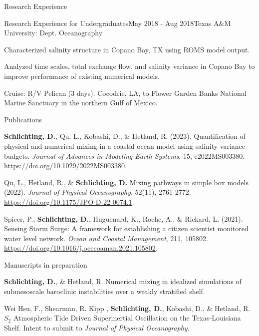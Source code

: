\documentclass{resume} %
\begin{document}
\begin{rSection}{Research Experience}
\begin{rSubsection}{Research Experience for Undergraduates}{May 2018 - Aug 2018}{Texas A$\&$M University: Dept. Oceanography}{} 
\item Characterized salinity structure in Copano Bay, TX using ROMS model output.
\item Analyzed time scales, total exchange flow, and salinity variance in Copano Bay to improve performance of existing numerical models.
\item Cruise: R/V Pelican (3 days). Cocodrie, LA, to Flower Garden Banks National Marine Sanctuary in the northern Gulf of Mexico.
\end{rSubsection} 
\end{rSection} 
\vspace{-3pt}

\begin{rSection}{Publications}
\vspace{-3pt}

\begin{etaremune}
\item \textbf{Schlichting, D.}, Qu, L., Kobashi, D., \& Hetland, R. (2023). Quantification of physical and numerical mixing in a coastal ocean model using salinity variance budgets. \textit{Journal of Advances in Modeling Earth Systems},
15, e2022MS003380. \url{https://doi.org/10.1029/2022MS003380}.
\item Qu, L., Hetland, R., \& \textbf{Schlichting, D.} Mixing pathways in simple box models (2022). \textit{Journal of Physical Oceanography}, 52(11), 2761-2772. \url{https://doi.org/10.1175/JPO-D-22-0074.1}.
\item Spicer, P., \textbf{Schlichting, D.}, Huguenard, K., Roche, A., \& Rickard, L. (2021). Sensing Storm Surge: A framework for establishing a citizen scientist monitored water level network. \textit{Ocean and Coastal Management}, 211, 105802. \url{https://doi.org/10.1016/j.ocecoaman.2021.105802}.
\end{etaremune}
\end{rSection}

\begin{rSection}{Manuscripts in preparation}
\vspace{-3pt}
\begin{etaremune}
\item \textbf{Schlichting, D.}, \& Hetland, R. Numerical mixing in idealized simulations of submesoscale baroclinic instabilities over a weakly stratified shelf.
\item Wei Hsu, F., Shearman, R. Kipp , \textbf{Schlichting, D.}, Kobashi, D., \& Hetland, R. $S_2$ Atmospheric Tide Driven Superinertial Oscillation on the Texas-Louisiana Shelf. Intent to submit to \textit{Journal of Physical Oceanography}.
\end{etaremune}
\end{rSection}
\end{document}
